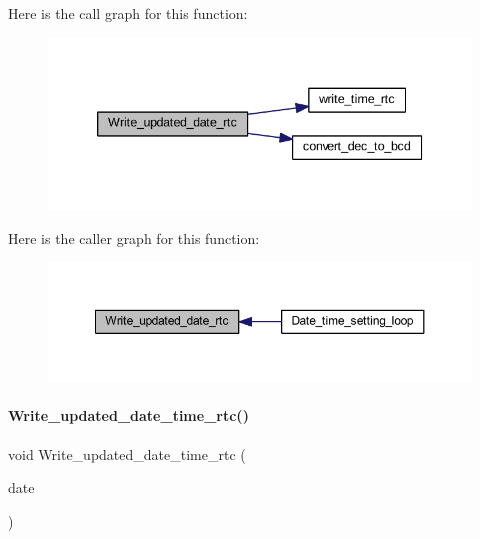 Here is the call graph for this function\+:
\nopagebreak
\begin{figure}[H]
\begin{center}
\leavevmode
\includegraphics[width=339pt]{a00017_a7ae143903216d08d3f0c07b95e21c21b_cgraph}
\end{center}
\end{figure}
Here is the caller graph for this function\+:
\nopagebreak
\begin{figure}[H]
\begin{center}
\leavevmode
\includegraphics[width=350pt]{a00017_a7ae143903216d08d3f0c07b95e21c21b_icgraph}
\end{center}
\end{figure}
\mbox{\label{a00017_ad20fe32d70b509ba8f7f24a572e34f3f}} 
\paragraph{Write\+\_\+updated\+\_\+date\+\_\+time\+\_\+rtc()}
{\footnotesize\ttfamily void Write\+\_\+updated\+\_\+date\+\_\+time\+\_\+rtc (\begin{DoxyParamCaption}\item[{\textbf{ Date\+Time} $\ast$}]{date }\end{DoxyParamCaption})}

